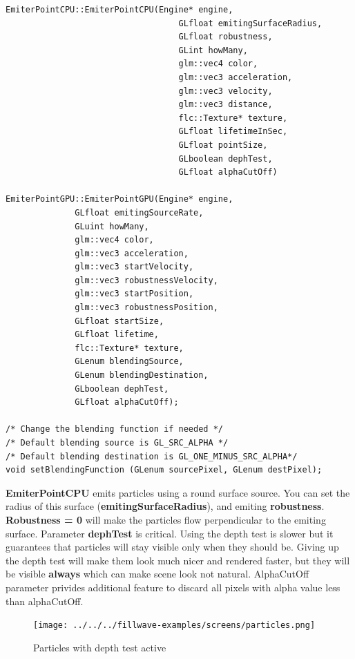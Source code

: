 \documentclass{article}
\begin{document}
\begin{lstlisting}
EmiterPointCPU::EmiterPointCPU(Engine* engine,
                                   GLfloat emitingSurfaceRadius,
                                   GLfloat robustness,
                                   GLint howMany,
                                   glm::vec4 color,
                                   glm::vec3 acceleration,
                                   glm::vec3 velocity,
                                   glm::vec3 distance,
                                   flc::Texture* texture,
                                   GLfloat lifetimeInSec,
                                   GLfloat pointSize,
                                   GLboolean dephTest,
                                   GLfloat alphaCutOff)
                                   
EmiterPointGPU::EmiterPointGPU(Engine* engine,
              GLfloat emitingSourceRate,
              GLuint howMany,
              glm::vec4 color,
              glm::vec3 acceleration,
              glm::vec3 startVelocity,
              glm::vec3 robustnessVelocity,
              glm::vec3 startPosition,
              glm::vec3 robustnessPosition,
              GLfloat startSize,
              GLfloat lifetime,
	          flc::Texture* texture,
	          GLenum blendingSource,
	          GLenum blendingDestination,
	          GLboolean dephTest,
	          GLfloat alphaCutOff);

/* Change the blending function if needed */
/* Default blending source is GL_SRC_ALPHA */
/* Default blending destination is GL_ONE_MINUS_SRC_ALPHA*/
void setBlendingFunction (GLenum sourcePixel, GLenum destPixel);

\end{lstlisting}

\indent \textbf{EmiterPointCPU} emits particles using a round surface source. You can set the radius of this surface (\textbf{emitingSurfaceRadius}), and emiting \textbf{robustness}. \textbf{Robustness = 0} will make the particles flow perpendicular to the emiting surface. Parameter \textbf{dephTest} is critical. Using the depth test is slower but it guarantees that particles will stay visible only when they should be. Giving up the depth test will make them look much nicer and rendered faster, but they will be visible \textbf{always} which can make scene look not natural. AlphaCutOff parameter privides additional feature to discard all pixels with alpha value less than alphaCutOff.

\begin{figure}
    \centering
    \texttt{[image: ../../../fillwave-examples/screens/particles.png]}
    \caption{Particles with depth test active}
    \label{particle_depth_test}
\end{figure}
\end{document}
